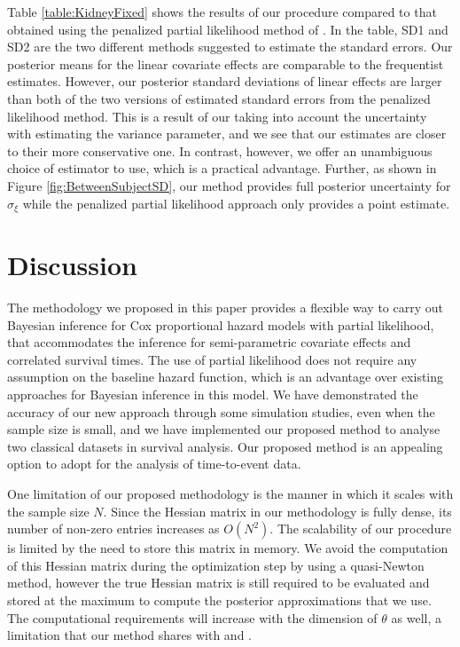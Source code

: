 \documentclass[ba]{imsart}
\begin{document}
Table \ref{table:KidneyFixed} shows the results of our procedure compared to that obtained using the penalized partial likelihood method of \cite{freqPL}. In the table, SD1 and SD2 are the two different methods \cite{freqPL} suggested to estimate the standard errors. Our posterior means for the linear covariate effects are comparable to the frequentist estimates. However, our posterior standard deviations of linear effects are larger than both of the two versions of estimated standard errors from the penalized likelihood method. This is a result of our taking into account the uncertainty with estimating the variance parameter, and we see that our estimates are closer to their more conservative one. In contrast, however, we offer an unambiguous choice of estimator to use, which is a practical advantage. Further, as shown in Figure \ref{fig:BetweenSubjectSD}, our method provides full posterior uncertainty for $\sigma_{\xi}$ while the penalized partial likelihood approach only provides a point estimate.

\section{Discussion}\label{sec:discussion}

The methodology we proposed in this paper provides a flexible way to carry out Bayesian inference for Cox proportional hazard models with partial likelihood, that accommodates the inference for semi-parametric covariate effects and correlated survival times. The use of partial likelihood does not require any assumption on the baseline hazard function, which is an advantage over existing approaches for Bayesian inference in this model. We have demonstrated the accuracy of our new approach through some simulation studies, even when the sample size is small, and we have implemented our proposed method to analyse two classical datasets in survival analysis. Our proposed method is an appealing option to adopt for the analysis of time-to-event data.

One limitation of our proposed methodology is the manner in which it scales with the sample size $N$. Since the Hessian matrix in our methodology is fully dense, its number of non-zero entries increases as $O(N^{2})$. The scalability of our procedure is limited by the need to store this matrix in memory. We avoid the computation of this Hessian matrix during the optimization step by using a quasi-Newton method, however the true Hessian matrix is still required to be evaluated and stored at the maximum to compute the posterior approximations that we use. The computational requirements will increase with the dimension of $\theta$ as well, a limitation that our method shares with \citet{inla} and \cite{casecross}.
\end{document}
